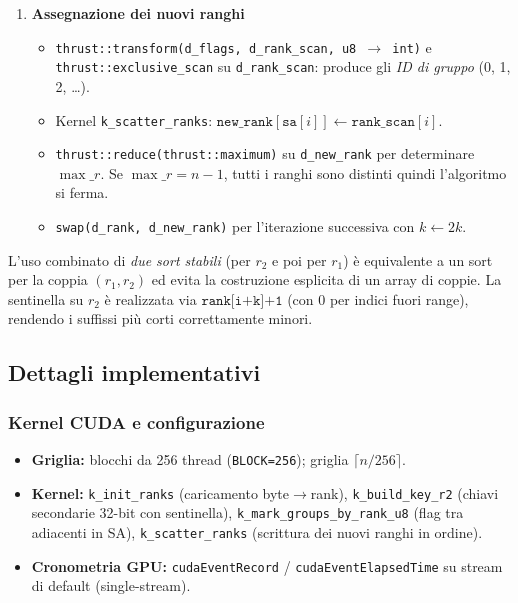 \begin{enumerate}
				\item \textbf{Assegnazione dei nuovi ranghi}
				\begin{itemize}
					\item \texttt{thrust::transform(d\_flags, d\_rank\_scan, u8\,$\to$\,int)} e \texttt{thrust::exclusive\_scan} su \texttt{d\_rank\_scan}: produce gli \emph{ID di gruppo} (0, 1, 2, \dots).
					\item Kernel \texttt{k\_scatter\_ranks}: \(\texttt{new\_rank}[\texttt{sa}[i]] \leftarrow \texttt{rank\_scan}[i]\).
					\item \texttt{thrust::reduce(thrust::maximum)} su \texttt{d\_new\_rank} per determinare \(\max\_r\).
					Se \(\max\_r = n{-}1\), tutti i ranghi sono distinti quindi l'algoritmo si ferma.
					\item \texttt{swap(d\_rank, d\_new\_rank)} per l’iterazione successiva con \(k \leftarrow 2k\).
				\end{itemize}
			\end{enumerate}
			L'uso combinato di \emph{due sort stabili} (per \(r_2\) e poi per \(r_1\)) è equivalente a un sort per la coppia \((r_1,r_2)\) ed evita la costruzione esplicita di un array di coppie.
			La sentinella su \(r_2\) è realizzata via \(\texttt{rank[i{+}k]{+}1}\) (con 0 per indici fuori range), rendendo i suffissi più corti correttamente minori.
		
		\subsection{Dettagli implementativi}
			
			\subsubsection*{Kernel CUDA e configurazione}
				\begin{itemize}
						\item \textbf{Griglia:} blocchi da 256 thread (\texttt{BLOCK=256}); griglia \(\lceil n/256 \rceil\).
						\item \textbf{Kernel:}
						\texttt{k\_init\_ranks} (caricamento byte$\to$rank),
						\texttt{k\_build\_key\_r2} (chiavi secondarie 32-bit con sentinella),
						\texttt{k\_mark\_groups\_by\_rank\_u8} (flag tra adiacenti in SA),
						\texttt{k\_scatter\_ranks} (scrittura dei nuovi ranghi in ordine).
						\item \textbf{Cronometria GPU:} \texttt{cudaEventRecord} / \texttt{cudaEventElapsedTime} su stream di default (single-stream).
				\end{itemize}
			
